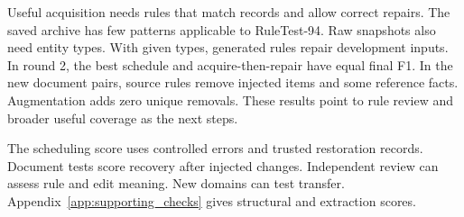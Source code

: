 Useful acquisition needs rules that match records and allow correct
repairs. The saved archive has few patterns applicable to RuleTest-94.
Raw snapshots also need entity types. With given types, generated rules
repair development inputs. In round 2, the best schedule and
acquire-then-repair have equal final F1. In the new document pairs,
source rules remove injected items and some reference facts.
Augmentation adds zero unique removals. These results point to rule
review and broader useful coverage as the next steps.

The scheduling score uses controlled errors and trusted restoration
records. Document tests score recovery after injected changes.
Independent review can assess rule and edit meaning. New domains can
test transfer. Appendix~\ref{app:supporting_checks} gives structural
and extraction scores.
